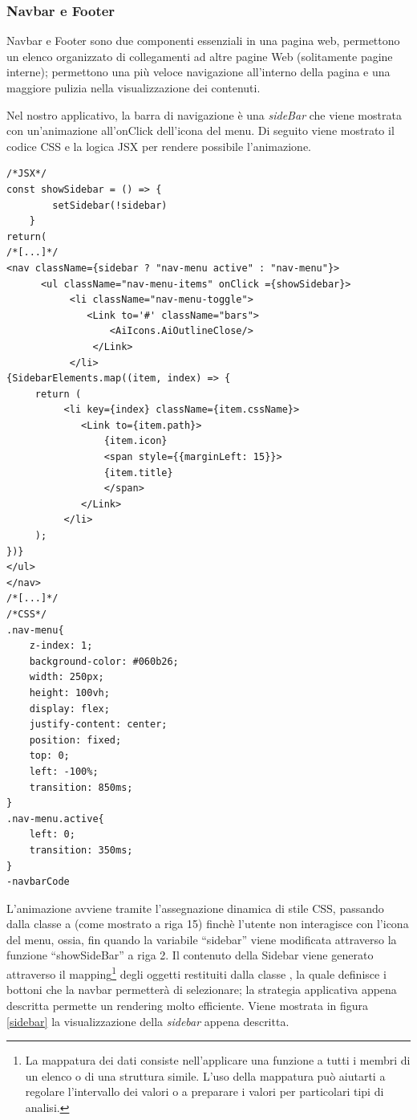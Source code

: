 \subsubsection{Navbar e Footer}

Navbar e Footer sono due componenti essenziali in una pagina web, permettono un elenco organizzato di collegamenti ad altre pagine Web (solitamente pagine interne); permettono una più veloce navigazione all'interno della pagina e una maggiore pulizia nella visualizzazione dei contenuti.

Nel nostro applicativo, la barra di navigazione è una \textit{sideBar} che viene mostrata con un'animazione all'onClick dell'icona del menu. Di seguito viene mostrato il codice CSS e la logica JSX per rendere possibile l'animazione.  
\begin{lstlisting}[caption={[Navbar Code (staking)]},language=HTML5]
/*JSX*/
const showSidebar = () => {
        setSidebar(!sidebar)
    }
return(
/*[...]*/
<nav className={sidebar ? "nav-menu active" : "nav-menu"}>
      <ul className="nav-menu-items" onClick ={showSidebar}>
           <li className="nav-menu-toggle">
              <Link to='#' className="bars">
                  <AiIcons.AiOutlineClose/>
               </Link>
           </li>
{SidebarElements.map((item, index) => {
     return (
          <li key={index} className={item.cssName}>
             <Link to={item.path}>
                 {item.icon}
                 <span style={{marginLeft: 15}}>
                 {item.title}
                 </span>
             </Link>
          </li>
     );
})}
</ul>
</nav>
/*[...]*/
/*CSS*/
.nav-menu{
    z-index: 1;
    background-color: #060b26;
    width: 250px;
    height: 100vh;
    display: flex;
    justify-content: center;
    position: fixed;
    top: 0;
    left: -100%;
    transition: 850ms;
}
.nav-menu.active{
    left: 0;
    transition: 350ms;
}																					    	      -navbarCode
\end{lstlisting}

L'animazione avviene tramite l'assegnazione dinamica di stile CSS, passando dalla classe  a (come mostrato a riga 15) finchè l'utente non interagisce con l'icona del menu, ossia, fin quando la variabile “sidebar” viene modificata attraverso la funzione “showSideBar” a riga 2. Il contenuto della Sidebar viene generato attraverso il mapping\footnote{La mappatura dei dati consiste nell'applicare una funzione a tutti i membri di un elenco o di una struttura simile. L'uso della mappatura può aiutarti a regolare l'intervallo dei valori o a preparare i valori per particolari tipi di analisi.} degli oggetti restituiti dalla classe , la quale definisce i bottoni che la navbar permetterà di selezionare; la strategia applicativa appena descritta permette un rendering molto efficiente. Viene mostrata in figura \ref{sidebar} la visualizzazione della \textit{sidebar} appena descritta.

